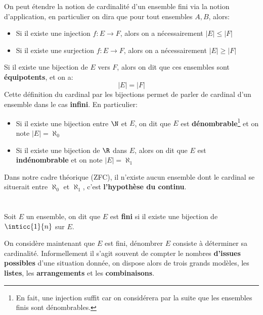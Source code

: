 \subsection*{}
On peut étendre la notion de cardinalité d'un ensemble fini via la notion d'application, en particulier on dira que pour tout ensembles \( A, B \), alors:
\begin{itemize}
   \item Si il existe une injection \(f : E \longrightarrow F\), alors on a nécessairement \(|E| \leq |F|\)
   \item Si il existe une surjection \(f : E \longrightarrow F\), alors on a nécessairement \(|E| \geq |F|\)
\end{itemize}
Si il existe une bijection de \(E\) vers \(F\), alors on dit que ces ensembles sont \textbf{équipotents}, et on a:
\[
    |E| = |F|
\]
Cette définition du cardinal par les bijections permet de parler de cardinal d'un ensemble dans le cas \textbf{infini}. En particulier:
\begin{itemize}
   \item Si il existe une bijection entre \(\N\) et \(E\), on dit que \(E\) est \textbf{dénombrable}\footnote[2]{En fait, une injection suffit car on considérera par la suite que les ensembles finis sont dénombrables.} et on note \(|E| = \aleph_0\)
   \item Si il existe une bijection de \(\R\) dans \(E\), alors on dit que \(E\) est \textbf{indénombrable} et on note \(|E| = \aleph_1\)
\end{itemize}

Dans notre cadre théorique (ZFC), il n'existe aucun ensemble dont le cardinal se situerait entre \(\aleph_0\) et \(\aleph_1\), c'est \textbf{l'hypothèse du continu}.
\chapter*{} %

Soit \(E\) un ensemble, on dit que \(E\) est \textbf{fini} si il existe une bijection de \(\inticc{1}{n}\) sur \(E\).\<

On considère maintenant que \(E\) est fini, dénombrer \(E\) consiste à déterminer sa cardinalité. Informellement il s'agit souvent de compter le nombres \textbf{d'issues possibles} d'une situation donnée, on dispose alors de trois grands modèles, les \textbf{listes}, les \textbf{arrangements} et les \textbf{combinaisons}.


